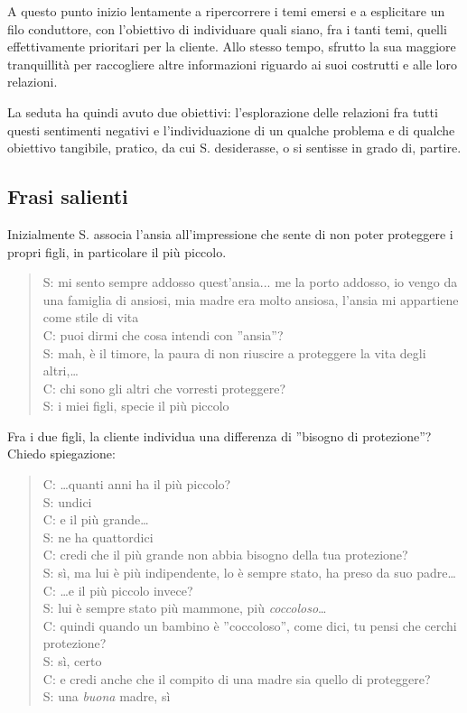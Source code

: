 A questo punto inizio lentamente a ripercorrere i temi emersi e a esplicitare un filo conduttore, con l'obiettivo di individuare quali siano, fra i tanti temi, quelli effettivamente prioritari per la cliente. Allo stesso tempo, sfrutto la sua maggiore tranquillità per raccogliere altre informazioni riguardo ai suoi costrutti e alle loro relazioni.
 
La seduta ha quindi avuto due obiettivi: l'esplorazione delle relazioni fra tutti questi sentimenti negativi e l'individuazione di un qualche problema e di qualche obiettivo tangibile, pratico, da cui S. desiderasse, o si sentisse in grado di, partire. 

\subsection{Frasi salienti}
\label{ss:frasi salienti}
Inizialmente S. associa l'ansia all'impressione che sente di non poter proteggere i propri figli, in particolare il più piccolo.

\begin{verse}
S: mi sento sempre addosso quest'ansia... me la porto addosso, io vengo da una famiglia di ansiosi, mia madre era molto ansiosa, l'ansia mi appartiene come stile di vita\\
C: puoi dirmi che cosa intendi con ''ansia''?\\
S: mah, è il timore, la paura di non riuscire a proteggere la vita degli altri,\ldots\\
C: chi sono gli altri che vorresti proteggere?\\
S: i miei figli, specie il più piccolo\\

\end{verse}

\noindent Fra i due figli, la cliente individua una differenza di ''bisogno di protezione''? Chiedo spiegazione:

\begin{verse}
C: \ldots{}quanti anni ha il più piccolo?\\
S: undici\\
C: e il più grande\ldots{}\\
S: ne ha quattordici\\
C: credi che il più grande non abbia bisogno della tua protezione?\\
S: sì, ma lui è più indipendente, lo è sempre stato, ha preso da suo padre\ldots\\
C: \ldots{}e il più piccolo invece?\\
S: lui è sempre stato più mammone, più \emph{coccoloso}\ldots\\
C: quindi quando un bambino è ''coccoloso'', come dici, tu pensi che cerchi protezione?\\
S: sì, certo\\
C: e credi anche che il compito di una madre sia quello di proteggere?\\
S: una \emph{buona} madre, sì
\end{verse}

